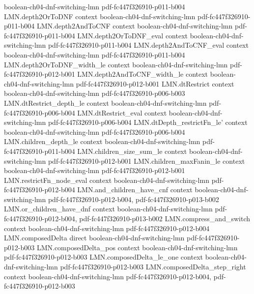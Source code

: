 \begin{theorem}
  {boolean-ch04-dnf-switching-lmn}
  {pdf-fc447f326910-p011-b004}
\proofstep
  {LMN.depth2OrToDNF}
  {context}
  {boolean-ch04-dnf-switching-lmn}
  {pdf-fc447f326910-p011-b004}
\proofstep
  {LMN.depth2AndToCNF}
  {context}
  {boolean-ch04-dnf-switching-lmn}
  {pdf-fc447f326910-p011-b004}
\proofstep
  {LMN.depth2OrToDNF_eval}
  {context}
  {boolean-ch04-dnf-switching-lmn}
  {pdf-fc447f326910-p011-b004}
\proofstep
  {LMN.depth2AndToCNF_eval}
  {context}
  {boolean-ch04-dnf-switching-lmn}
  {pdf-fc447f326910-p011-b004}
\proofstep
  {LMN.depth2OrToDNF_width_le}
  {context}
  {boolean-ch04-dnf-switching-lmn}
  {pdf-fc447f326910-p012-b001}
\proofstep
  {LMN.depth2AndToCNF_width_le}
  {context}
  {boolean-ch04-dnf-switching-lmn}
  {pdf-fc447f326910-p012-b001}
\proofstep
  {LMN.dtRestrict}
  {context}
  {boolean-ch04-dnf-switching-lmn}
  {pdf-fc447f326910-p006-b003}
\proofstep
  {LMN.dtRestrict_depth_le}
  {context}
  {boolean-ch04-dnf-switching-lmn}
  {pdf-fc447f326910-p006-b004}
\proofstep
  {LMN.dtRestrict_eval}
  {context}
  {boolean-ch04-dnf-switching-lmn}
  {pdf-fc447f326910-p006-b004}
\proofstep
  {LMN.dtDepth_restrictFn_le'}
  {context}
  {boolean-ch04-dnf-switching-lmn}
  {pdf-fc447f326910-p006-b004}
\proofstep
  {LMN.children_depth_le}
  {context}
  {boolean-ch04-dnf-switching-lmn}
  {pdf-fc447f326910-p011-b004}
\proofstep
  {LMN.children_size_sum_le}
  {context}
  {boolean-ch04-dnf-switching-lmn}
  {pdf-fc447f326910-p012-b001}
\proofstep
  {LMN.children_maxFanin_le}
  {context}
  {boolean-ch04-dnf-switching-lmn}
  {pdf-fc447f326910-p012-b001}
\proofstep
  {LMN.restrictFn_node_eval}
  {context}
  {boolean-ch04-dnf-switching-lmn}
  {pdf-fc447f326910-p012-b004}
\proofstep
  {LMN.and_children_have_cnf}
  {context}
  {boolean-ch04-dnf-switching-lmn}
  {pdf-fc447f326910-p012-b004,
    pdf-fc447f326910-p013-b002}
\proofstep
  {LMN.or_children_have_dnf}
  {context}
  {boolean-ch04-dnf-switching-lmn}
  {pdf-fc447f326910-p012-b004,
    pdf-fc447f326910-p013-b002}
\proofstep
  {LMN.compress_and_switch}
  {context}
  {boolean-ch04-dnf-switching-lmn}
  {pdf-fc447f326910-p012-b004}
\proofstep
  {LMN.composedDelta}
  {direct}
  {boolean-ch04-dnf-switching-lmn}
  {pdf-fc447f326910-p012-b003}
\proofstep
  {LMN.composedDelta_pos}
  {context}
  {boolean-ch04-dnf-switching-lmn}
  {pdf-fc447f326910-p012-b003}
\proofstep
  {LMN.composedDelta_le_one}
  {context}
  {boolean-ch04-dnf-switching-lmn}
  {pdf-fc447f326910-p012-b003}
\proofstep
  {LMN.composedDelta_step_right}
  {context}
  {boolean-ch04-dnf-switching-lmn}
  {pdf-fc447f326910-p012-b004,
    pdf-fc447f326910-p012-b003}

\end{theorem}
